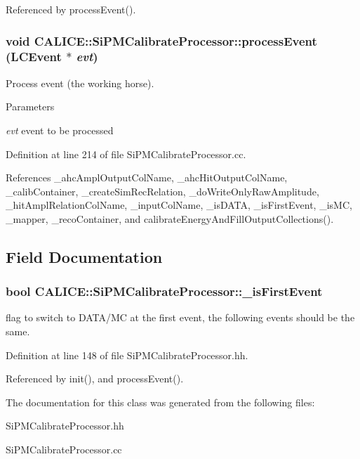 Referenced by processEvent().
\subsubsection[{processEvent}]{\setlength{\rightskip}{0pt plus 5cm}void CALICE::SiPMCalibrateProcessor::processEvent (LCEvent $\ast$ {\em evt})\hspace{0.3cm}{\ttfamily  [virtual]}}\label{classCALICE_1_1SiPMCalibrateProcessor_ae71fa4bb6335fbb7ee61ab5d8754e152}


Process event (the working horse). 
\begin{DoxyParams}{Parameters}
\item[{\em evt}]event to be processed \end{DoxyParams}


Definition at line 214 of file SiPMCalibrateProcessor.cc.

References \_\-ahcAmplOutputColName, \_\-ahcHitOutputColName, \_\-calibContainer, \_\-createSimRecRelation, \_\-doWriteOnlyRawAmplitude, \_\-hitAmplRelationColName, \_\-inputColName, \_\-isDATA, \_\-isFirstEvent, \_\-isMC, \_\-mapper, \_\-recoContainer, and calibrateEnergyAndFillOutputCollections().

\subsection{Field Documentation}
\subsubsection[{\_\-isFirstEvent}]{\setlength{\rightskip}{0pt plus 5cm}bool {\bf CALICE::SiPMCalibrateProcessor::\_\-isFirstEvent}\hspace{0.3cm}{\ttfamily  [protected]}}\label{classCALICE_1_1SiPMCalibrateProcessor_a33046a6aada7df9b6a5c369d852c6c23}


flag to switch to DATA/MC at the first event, the following events should be the same. 

Definition at line 148 of file SiPMCalibrateProcessor.hh.

Referenced by init(), and processEvent().

The documentation for this class was generated from the following files:\begin{DoxyCompactItemize}
\item 
SiPMCalibrateProcessor.hh\item 
SiPMCalibrateProcessor.cc\end{DoxyCompactItemize}
